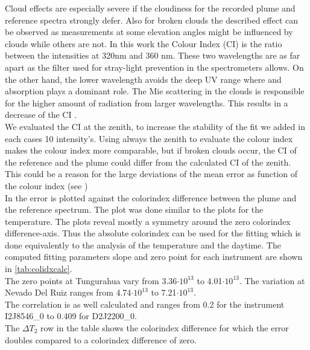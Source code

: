 Cloud effects are especially severe if the cloudiness for the recorded plume and reference spectra strongly defer. Also for broken clouds the described effect can be observed as measurements at some elevation angles might be influenced by clouds while others are not.
In this work the Colour Index (CI) is the ratio between the intensities at 320nm and 360 nm.
These two wavelengths are as far apart as the filter used for stray-light prevention in the spectrometers allows.
On the other hand, the lower wavelength avoids the deep UV range where  and   absorption plays a dominant role.
The Mie scattering in the clouds is responsible for the higher amount of radiation from larger wavelengths. This results in a decrease of the CI \citep{lubcke2014optical}.\\
We evaluated the CI at the zenith, to increase the stability of the fit we added in each cases 10 intensity's. Using always the zenith to evaluate the colour index makes the colour index more comparable, but if broken clouds occur, the CI of the reference and the plume could differ from the calculated CI of the zenith. This could be a reason for the large deviations of the mean  error as function of the colour index (see )\\
In  the  error is plotted against the colorindex difference between the plume and the reference spectrum. The plot was done similar to the plots for the temperature.
The plots reveal mostly a symmetry around the zero colorindex difference-axis. Thus the absolute colorindex can be used for the fitting which is done equivalently to the analysis of the temperature and the daytime. The computed fitting parameters slope and zero point for each instrument are shown in \cref{tab:colidxcalc}. \\
The zero points at Tungurahua vary from 3.36$\cdot10^{13}$ to 4.01$\cdot10^{13}$. The variation at Nevado Del Ruiz ranges from  4.74$\cdot10^{13}$ to 7.21$\cdot10^{13}$.\\
The correlation is as well calculated and ranges from 0.2 for the instrument I2J8546\_0 to  0.409 for D2J2200\_0.\\
The $\Delta T_{2}$ row in the table shows the colorindex difference for which the error doubles compared to a colorindex difference of zero.
